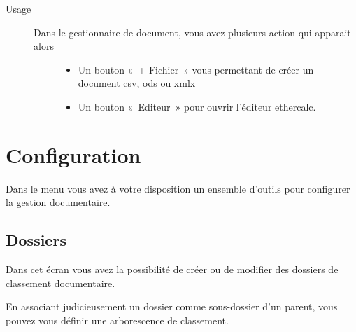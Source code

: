 \documentclass[letterpaper,10pt,french]{sphinxmanual}
\begin{document}
\begin{sphinxVerbatim}[commandchars=\\\{\}]
   
\end{sphinxVerbatim}
\begin{description}
\item[{Usage}] \leavevmode\begin{description}
\item[{Dans le gestionnaire de document, vous avez plusieurs action qui apparait alors}] \leavevmode\begin{itemize}
\item {} 
Un bouton « + Fichier » vous permettant de créer un document csv, ods ou xmlx

\item {} 
Un bouton « Editeur » pour ouvrir l’éditeur ethercalc.

\end{itemize}

\end{description}

\end{description}

\noindent{}


\section{Configuration}
\label{\detokenize{documents/configuration:configuration}}\label{\detokenize{documents/configuration::doc}}
Dans le menu  vous avez à votre disposition un ensemble d’outils pour configurer la gestion documentaire.


\subsection{Dossiers}
\label{\detokenize{documents/configuration:dossiers}}
Dans cet écran vous avez la possibilité de créer ou de modifier des dossiers de classement documentaire.

\noindent{}

En associant judicieusement un dossier comme sous-dossier d’un parent, vous pouvez vous définir une arborescence de classement.
\end{document}
